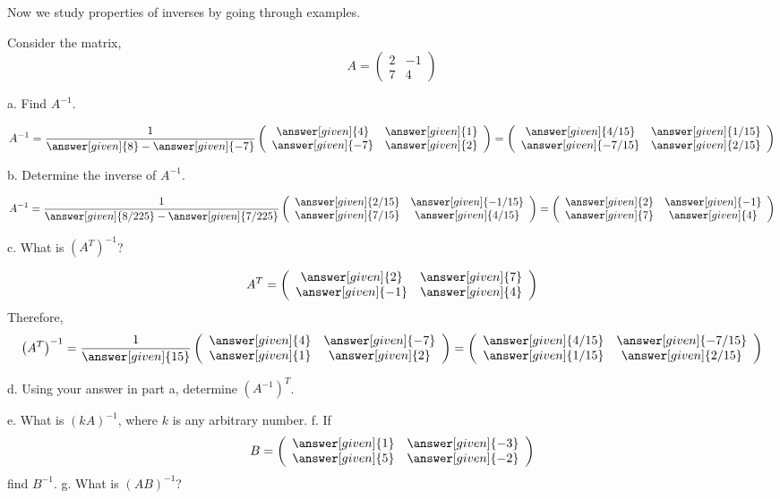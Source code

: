 \documentclass{ximera}
\begin{document}
Now we study properties of inverses by going through examples.
\begin{example}\label{example1}
Consider the matrix,
\[A= \left(\begin{array}{cc}
  2 &  -1  \\
   7&  4
\end{array}\right)\]

a. Find $A^{-1}$.
\begin{prompt}
\[A^{-1}= \frac{1}{\answer[given]{8}- \answer[given]{-7}}\left(\begin{array}{cc}
  \answer[given]{4} &  \answer[given]{1}  \\
   \answer[given]{-7}&  \answer[given]{2}
\end{array}\right)= \left(\begin{array}{cc}
  \answer[given]{4/15} &  \answer[given]{1/15}  \\
   \answer[given]{-7/15}&  \answer[given]{2/15}
\end{array}\right)
\]
\end{prompt}
b. Determine the inverse of $A^{-1}$.
\begin{prompt}
\[A^{-1}= \frac{1}{\answer[given]{8/225}- \answer[given]{7/225}}\left(\begin{array}{cc}
  \answer[given]{2/15} &  \answer[given]{-1/15}  \\
   \answer[given]{7/15}&  \answer[given]{4/15}
\end{array}\right)= \left(\begin{array}{cc}
  \answer[given]{2} &  \answer[given]{-1}  \\
   \answer[given]{7}&  \answer[given]{4}
\end{array}\right)
\]
\end{prompt}
c. What is $\left(A^{T}\right)^{-1}$?
\begin{prompt}
\[A^{T}= \left(\begin{array}{cc}
  \answer[given]{2} &  \answer[given]{7}  \\
   \answer[given]{-1}&  \answer[given]{4}
\end{array}\right)
\]
Therefore,
\[\left(A^{T}\right)^{-1}= \frac{1}{\answer[given]{15}}\left(\begin{array}{cc}
  \answer[given]{4} &  \answer[given]{-7}  \\
   \answer[given]{1}&  \answer[given]{2}
\end{array}\right) = \left(\begin{array}{cc}
  \answer[given]{4/15} &  \answer[given]{-7/15}  \\
   \answer[given]{1/15}&  \answer[given]{2/15}
\end{array}\right) \]
\end{prompt}
d. Using your answer in part a, determine $\left(A^{-1}\right)^{T}$.

e. What is $(kA)^{-1}$, where $k$ is any arbitrary number.
f. If
\[B= \left(\begin{array}{cc}
  \answer[given]{1} &  \answer[given]{-3}  \\
   \answer[given]{5}&  \answer[given]{-2}
\end{array}\right)
\]
find $B^{-1}$.
g. What is $(AB)^{-1}$?
\end{example}
\end{document}
